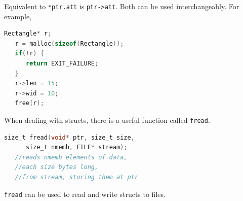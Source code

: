 \documentclass[nobib]{tufte-handout}
\begin{document}
Equivalent to \texttt{*ptr.att} is \texttt{ptr->att}. Both can be used 
interchangeably. For example, 
\begin{lstlisting}[language=C,caption=-> and malloc]
   Rectangle* r;
   r = malloc(sizeof(Rectangle));
   if(!r) {
      return EXIT_FAILURE;
   }
   r->len = 15;
   r->wid = 10;
   free(r);
\end{lstlisting}
When dealing with structs, there is a useful function called \texttt{fread}. 
\begin{lstlisting}[language=C,caption=fread]
   size_t fread(void* ptr, size_t size, 
      size_t nmemb, FILE* stream);
   //reads nmemb elements of data, 
   //each size bytes long, 
   //from stream, storing them at ptr
\end{lstlisting}
\texttt{fread} can be used to read and write structs to files.
\end{document}
